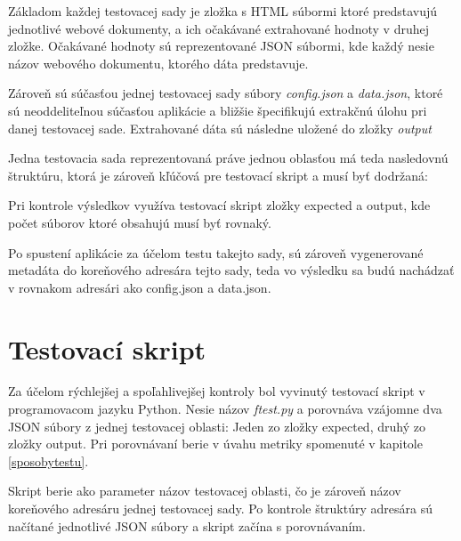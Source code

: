 Základom každej testovacej sady je zložka s HTML súbormi ktoré predstavujú jednotlivé webové dokumenty, a ich očakávané extrahované hodnoty v druhej zložke. Očakávané hodnoty sú reprezentované JSON súbormi, kde každý nesie názov webového dokumentu, ktorého dáta predstavuje. 

Zároveň sú súčasťou jednej testovacej sady súbory \textit{config.json} a \textit{data.json}, ktoré sú neoddeliteľnou súčasťou aplikácie a bližšie špecifikujú extrakčnú úlohu pri danej testovacej sade. Extrahované dáta sú následne uložené do zložky \textit{output}

Jedna testovacia sada reprezentovaná práve jednou oblasťou má teda nasledovnú štruktúru, ktorá je zároveň kľúčová pre testovací skript a musí byť dodržaná:

\bigskip


\bigskip

Pri kontrole výsledkov využíva testovací skript zložky expected a output, kde počet súborov ktoré obsahujú musí byť rovnaký.

Po spustení aplikácie za účelom testu takejto sady, sú zároveň vygenerované metadáta do koreňového adresára tejto sady, teda vo výsledku sa budú nachádzať v rovnakom adresári ako config.json a data.json.


\section{Testovací skript}

Za účelom rýchlejšej a spoľahlivejšej kontroly bol vyvinutý testovací skript v programovacom jazyku Python. Nesie názov \textit{ftest.py} a porovnáva vzájomne dva JSON súbory z jednej testovacej oblasti: Jeden zo zložky expected, druhý zo zložky output. Pri porovnávaní berie v úvahu metriky spomenuté v kapitole \ref{sposobytestu}.

Skript berie ako parameter názov testovacej oblasti, čo je zároveň názov koreňového adresáru jednej testovacej sady. Po kontrole štruktúry adresára sú načítané jednotlivé JSON súbory a skript začína s porovnávaním.

